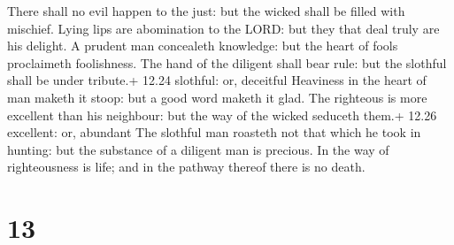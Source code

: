  There shall no evil happen to the just: but the wicked
shall be filled with mischief.  Lying lips are abomination
to the LORD: but they that deal truly are his delight.  A
prudent man concealeth knowledge: but the heart of fools proclaimeth
foolishness.  The hand of the diligent shall bear rule: but
the slothful shall be under tribute.+ 12.24 slothful: or, deceitful
 Heaviness in the heart of man maketh it stoop: but a good
word maketh it glad.  The righteous is more excellent than
his neighbour: but the way of the wicked seduceth them.+ 12.26
excellent: or, abundant  The slothful man roasteth not that
which he took in hunting: but the substance of a diligent man is
precious.  In the way of righteousness is life; and in the
pathway thereof there is no death.

\hypertarget{section-12}{%
\section{13}\label{section-12}}

